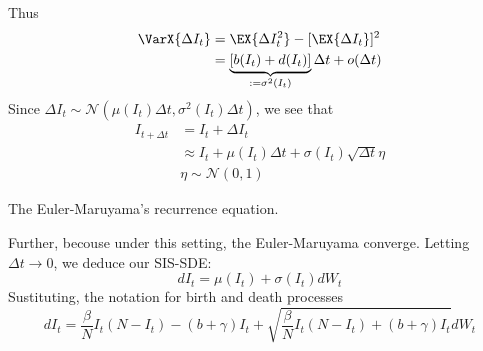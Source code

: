    \begin{frame}{}
        Thus
        \begin{align*}
            \VarX{\Delta I_t}
                &=
                    \EX{\Delta I_t ^ 2} - [\EX{\Delta I_t}] ^ 2
                \\
                & = 
                    \underbrace{
                        [b(I_t)  + d(I_t) ]
                    }_{:=\sigma^2(I_t)}
                     \Delta t + o(\Delta t)
        \end{align*} 
        Since 
        $
            \Delta I_t \sim \mathcal{N}
             (
                \mu(I_t) \Delta t, 
                \sigma ^ 2 (I_t) \Delta t
            )
        $,
        we see that 
        \begin{align*}
            I_{t+\Delta t} 
                &= 
                    I_t + \Delta I_t
            \\
                &\approx
                    I_t + \mu(I_t)\Delta t 
                    + \sigma(I_t) \sqrt{\Delta t} \eta
            \\
                & \eta \sim \mathcal{N}(0,1)
        \end{align*}
    \end{frame}
    The Euler-Maruyama's recurrence equation.
    \begin{frame}{}
    Further, becouse under this setting, the Euler-Maruyama converge.
    Letting $\Delta t \to 0$, we deduce our SIS-SDE:
    \begin{equation*}
        dI_t = \mu(I_t) + \sigma(I_t) dW_t
    \end{equation*}
    Sustituting, the notation for birth and death processes
    \begin{equation*}
        dI_t =
            \frac{\beta}{N} I_t(N - I_t)
            - (b + \gamma) I_t
            +
            \sqrt{
                \frac{\beta}{N} 
                    I_t (N - I_t)
                    +
                    (b + \gamma)I_t
            }
            dW_t
    \end{equation*}
\end{frame}